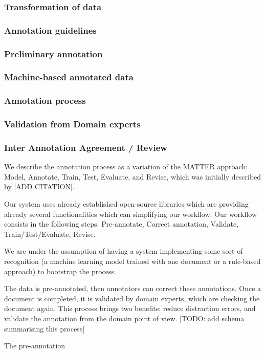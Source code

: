 \documentclass[a4paper,10pt]{article}
\begin{document}
\subsubsection{Transformation of data}
\subsubsection{Annotation guidelines}
\subsubsection{Preliminary annotation}
\subsubsection{Machine-based annotated data}
\subsubsection{Annotation process}
\subsubsection{Validation from Domain experts}
\subsubsection{Inter Annotation Agreement / Review}

We describe the annotation process as a variation of the MATTER approach: Model, Annotate, Train, Test, Evaluate, and Revise, which was initially described by [ADD CITATION]. 

Our system uses already established open-source libraries which are providing already several functionalities which can simplifying our workflow. Our workflow consists in the following steps: Pre-annotate, Correct annotation, Validate, Train/Test/Evaluate, Revise. 

We are under the assumption of having a system implementing some sort of recognition (a machine learning model trained with one document or a rule-based approach) to bootstrap the process. 

The data is pre-annotated, then annotators can correct these annotations. Once a document is completed, it is validated by domain experts, which are checking the document again. This process brings two benefits: reduce distraction errors, and validate the annotation from the domain point of view. 
[TODO: add schema summarising this process]

The pre-annotation 
\end{document}
